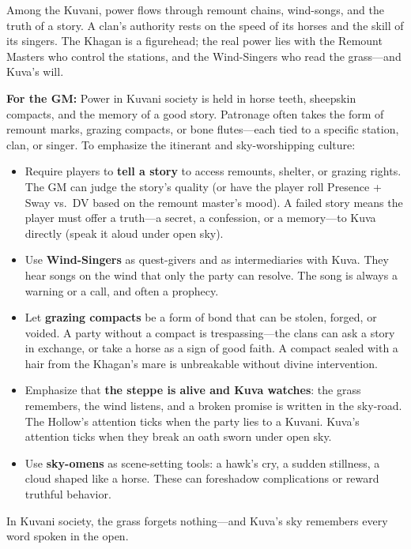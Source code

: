 \begin{tcolorbox}[colback=black!3,colframe=black!40!white,title={Patronage \& Power},breakable]
Among the Kuvani, power flows through remount chains, wind-songs, and the truth of a story. A clan's authority rests on the speed of its horses and the skill of its singers. The Khagan is a figurehead; the real power lies with the Remount Masters who control the stations, and the Wind-Singers who read the grass---and Kuva's will.

\textbf{For the GM:}  
Power in Kuvani society is held in horse teeth, sheepskin compacts, and the memory of a good story. Patronage often takes the form of remount marks, grazing compacts, or bone flutes---each tied to a specific station, clan, or singer. To emphasize the itinerant and sky-worshipping culture:
\begin{itemize}
\item Require players to \textbf{tell a story} to access remounts, shelter, or grazing rights. The GM can judge the story's quality (or have the player roll Presence + Sway vs.\ DV based on the remount master's mood). A failed story means the player must offer a truth---a secret, a confession, or a memory---to Kuva directly (speak it aloud under open sky).
\item Use \textbf{Wind-Singers} as quest-givers and as intermediaries with Kuva. They hear songs on the wind that only the party can resolve. The song is always a warning or a call, and often a prophecy.
\item Let \textbf{grazing compacts} be a form of bond that can be stolen, forged, or voided. A party without a compact is trespassing---the clans can ask a story in exchange, or take a horse as a sign of good faith. A compact sealed with a hair from the Khagan's mare is unbreakable without divine intervention.
\item Emphasize that \textbf{the steppe is alive and Kuva watches}: the grass remembers, the wind listens, and a broken promise is written in the sky-road. The Hollow's attention ticks when the party lies to a Kuvani. Kuva's attention ticks when they break an oath sworn under open sky.
\item Use \textbf{sky-omens} as scene-setting tools: a hawk's cry, a sudden stillness, a cloud shaped like a horse. These can foreshadow complications or reward truthful behavior.
\end{itemize}
In Kuvani society, the grass forgets nothing---and Kuva's sky remembers every word spoken in the open.
\end{tcolorbox}

